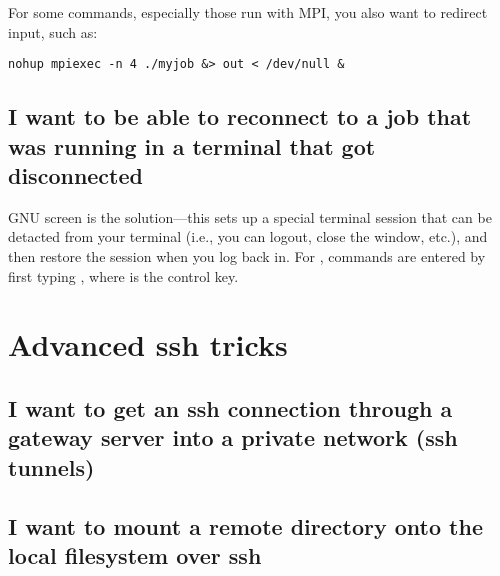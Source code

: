 For some commands, especially those run with MPI, you also want to redirect
input, such as:

\begin{lstlisting}
nohup mpiexec -n 4 ./myjob &> out < /dev/null &
\end{lstlisting}

\subsection{I want to be able to reconnect to a job that was running in a
terminal that got disconnected}

GNU screen is the solution---this sets up a special terminal session that can
be detacted from your terminal (i.e., you can logout, close the window, etc.),
and then restore the session when you log back in. For , commands
are entered by first typing , where \cmd{^} is the control key.

\section{Advanced ssh tricks}

\subsection{I want to get an ssh connection through a gateway server into a
private network (ssh tunnels)}

\subsection{I want to mount a remote directory onto the local filesystem over
ssh}
